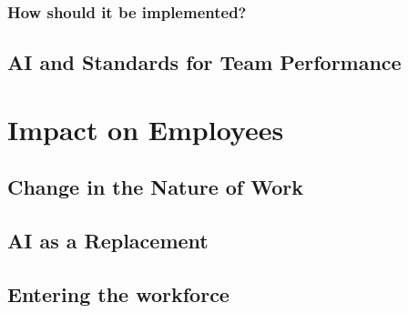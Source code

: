 \documentclass[
]{book}
\begin{document}
\hypertarget{how-should-it-be-implemented}{%
\subsection{How should it be implemented?}\label{how-should-it-be-implemented}}

\hypertarget{ai-and-standards-for-team-performance}{%
\section{AI and Standards for Team Performance}\label{ai-and-standards-for-team-performance}}

\hypertarget{impact-on-employees}{%
\chapter{Impact on Employees}\label{impact-on-employees}}

\hypertarget{change-in-the-nature-of-work}{%
\section{Change in the Nature of Work}\label{change-in-the-nature-of-work}}

\hypertarget{ai-as-a-replacement}{%
\section{AI as a Replacement}\label{ai-as-a-replacement}}

\hypertarget{entering-the-workforce}{%
\section{Entering the workforce}\label{entering-the-workforce}}

  
\end{document}
